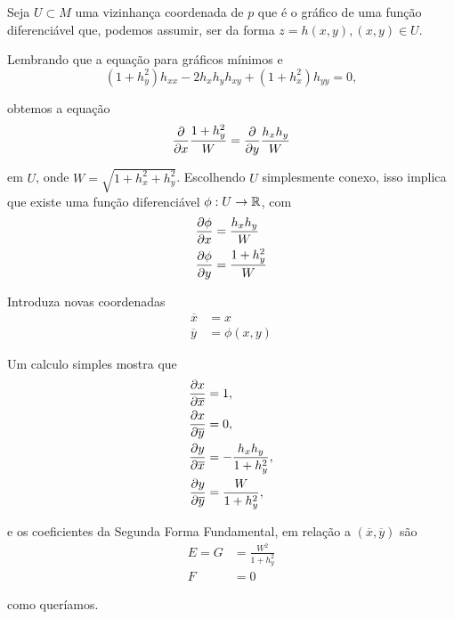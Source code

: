 \begin{demonstracao}
	Seja $U \subset M$ uma vizinhança coordenada de $p$ que é o gráfico de uma função diferenciável que, podemos assumir, ser da forma $z = h(x,y), (x,y) \in U$.
	
	Lembrando que a equação para gráficos mínimos e
	\begin{equation*}
	(1 + h_y^2) h_{xx} - 2 h_x h_y h_{xy} + (1 + h_x^2) h_{yy} = 0,
	\end{equation*}
	
	obtemos a equação
	\begin{equation*}
	\frac{\partial}{\partial x} \frac{1 + h_y^2}{W} = \frac{\partial}{\partial y} \frac{h_x h_y}{W}
	\end{equation*}
	
	em $U$, onde $W = \sqrt{1 + h_x^2 + h_y^2}$. Escolhendo $U$ simplesmente conexo, isso implica que existe uma função diferenciável $\phi: U \rightarrow \mathbb{R}$, com
	\begin{align*}
	\frac{\partial \phi}{\partial x} &= \frac{h_x h_y}{W} \\
	\frac{\partial \phi}{\partial y} &= \frac{1 + h_y^2}{W}
	\end{align*}
	
	Introduza novas coordenadas
	\begin{align*}
	\overline{x} &= x \\
	\overline{y} &= \phi(x,y)
	\end{align*}
	
	Um calculo simples mostra que
	\begin{align*}
	\frac{\partial x}{\partial \overline{x}} &= 1, \\
	\frac{\partial x}{\partial \overline{y}} &= 0, \\
	\frac{\partial y}{\partial \overline{x}} &= -\frac{h_x h_y}{1 + h_y^2}, \\
	\frac{\partial y}{\partial \overline{y}} &= \frac{W}{1 + h_y^2},
	\end{align*}
	
	e os coeficientes da Segunda Forma Fundamental, em relação a $(\overline{x}, \overline{y})$ são
	\begin{align*}
	E = G &= \frac{W^2}{1 + h_y^2} \\
	F &= 0
	\end{align*}
	
	como queríamos.
\end{demonstracao}